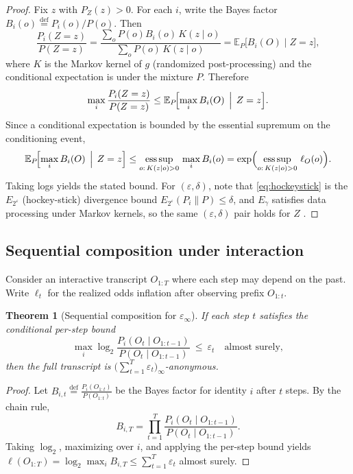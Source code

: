 \documentclass[11pt]{article}
\newcommand{\EE}{\mathbb{E}}
\newcommand{\defeq}{\stackrel{\mathrm{def}}{=}}
\newtheorem{theorem}{Theorem}
\theoremstyle{definition}
\theoremstyle{remark}
\begin{document}
\begin{proof}
Fix $z$ with $P_Z(z)>0$. For each $i$, write the Bayes factor $B_i(o)\defeq P_i(o)/P(o)$.
Then
\[
\frac{P_i(Z=z)}{P(Z=z)}=\frac{\sum_o P(o)B_i(o)\,K(z\mid o)}{\sum_o P(o)\,K(z\mid o)}=\EE_P\!\bigl[B_i(O)\mid Z=z\bigr],
\]
where $K$ is the Markov kernel of $g$ (randomized post-processing) and the conditional expectation is under the mixture $P$.
Therefore
\[
\max_i \frac{P_i(Z=z)}{P(Z=z)} \le \EE_P\!\Bigl[\max_i B_i(O)\,\Bigm|\, Z=z\Bigr].
\]
Since a conditional expectation is bounded by the essential supremum on the conditioning event,
\[
\EE_P\!\Bigl[\max_i B_i(O)\,\Bigm|\, Z=z\Bigr]
\le \operatorname*{ess\,sup}_{o:\,K(z\mid o)>0}\,\max_i B_i(o)
=\exp\Bigl(\operatorname*{ess\,sup}_{o:\,K(z\mid o)>0}\,\ell_O(o)\Bigr).
\]
Taking logs yields the stated bound.
For $(\varepsilon,\delta)$, note that \eqref{eq:hockeystick} is the $E_{2^\varepsilon}$ (hockey-stick) divergence bound $E_{2^\varepsilon}(P_i\|P)\le\delta$, and $E_\gamma$ satisfies data processing under Markov kernels, so the same $(\varepsilon,\delta)$ pair holds for $Z$ \cite{LiuCuffVerdu2017}.
\end{proof}

\subsection{Sequential composition under interaction}
Consider an interactive transcript $O_{1:T}$ where each step may depend on the past.
Write $\ell_t$ for the realized odds inflation after observing prefix $O_{1:t}$.

\begin{theorem}[Sequential composition for $\varepsilon_\infty$]\label{thm:epsinf_comp}
If each step $t$ satisfies the conditional per-step bound
\[
\max_i \log_2\frac{P_i(O_t\mid O_{1:t-1})}{P(O_t\mid O_{1:t-1})}\ \le\ \varepsilon_t
\quad \text{almost surely},
\]
then the full transcript is $\bigl(\sum_{t=1}^T \varepsilon_t\bigr)_\infty$-anonymous.
\end{theorem}

\begin{proof}
Let $B_{i,t}\defeq \frac{P_i(O_{1:t})}{P(O_{1:t})}$ be the Bayes factor for identity $i$ after $t$ steps.
By the chain rule,
\[
B_{i,T}=\prod_{t=1}^T \frac{P_i(O_t\mid O_{1:t-1})}{P(O_t\mid O_{1:t-1})}.
\]
Taking $\log_2$, maximizing over $i$, and applying the per-step bound yields
$\ell(O_{1:T})=\log_2\max_i B_{i,T}\le \sum_{t=1}^T \varepsilon_t$ almost surely.
\end{proof}
\end{document}
